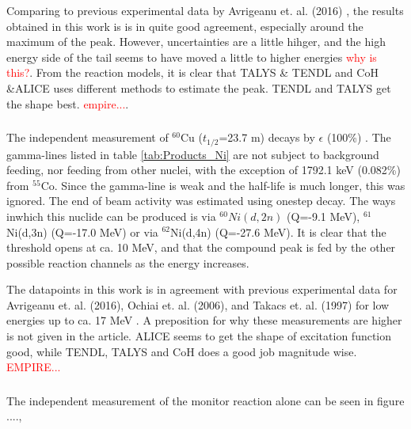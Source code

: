 \noindent Comparing to previous experimental data by Avrigeanu et. al. (2016) \cite{Avrigeanu2016}, the results obtained in this work is is in quite good agreement, especially around the maximum of the peak. However, uncertainties are a little hihger, and the high energy side of the tail seems to have moved a little to higher energies \textcolor{red}{why is this?}. From the reaction models, it is clear that TALYS \& TENDL and CoH \&ALICE uses different methods to estimate the peak. TENDL and TALYS get the shape best. \textcolor{red}{empire...}. 





\subsubsection{}
The independent measurement of $^{60}$Cu ($t_{1/2}$=23.7 m) decays by $\epsilon$ (100\%) \cite{Browne2013}. The gamma-lines listed in table \ref{tab:Products_Ni} are not subject to background feeding, nor feeding from other nuclei, with the exception of 1792.1 keV (0.082\%) from $^{55}$Co. Since the gamma-line is weak and the half-life is much longer, this was ignored. The end of beam activity was estimated using onestep decay. The ways inwhich this nuclide can be produced is via $^{60}Ni(d,2n)$ (Q=-9.1 MeV), $^{61}$Ni(d,3n) (Q=-17.0 MeV) or via $^{62}$Ni(d,4n) (Q=-27.6 MeV). It is clear that the threshold opens at ca. 10 MeV, and that the compound peak is fed by the other possible reaction channels as the energy increases.  

The datapoints in this work is in agreement with previous experimental data for Avrigeanu et. al. (2016), Ochiai et. al. (2006), and Takacs et. al. (1997) for low energies up to ca. 17 MeV \cite{Avrigeanu2016,Takacs1997,Ochiai2007}. A preposition for why these measurements are higher is not given in the article. ALICE seems to get the shape of excitation function good, while TENDL, TALYS and CoH does a good job magnitude wise. \textcolor{red}{EMPIRE...}


\subsubsection{}
The independent measurement of the monitor reaction alone can be seen in figure ...., 

